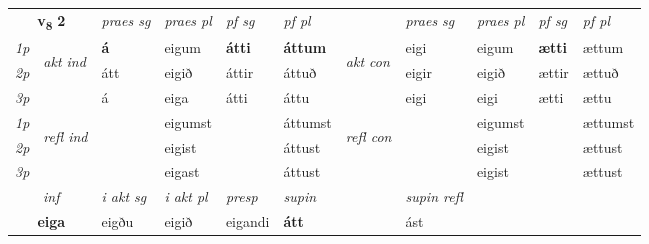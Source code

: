 \noindent
\begin{tabular}{lllllllllll} \toprule
\multicolumn{2}{c}{\textbf{v{\textsubscript{8}}} \Large{\textbf{2}}}  &  \textit{praes sg}  & \textit{praes pl}  &\textit{ pf sg} & \textit{pf pl} &  &  \textit{praes sg}  & \textit{praes pl}  & \textit{pf sg} & \textit{pf pl } \\*
	\cmidrule{3-6} \cmidrule{8-11}
 {\textit{1p}} & \multirow{3}{*}{\begin{turn}{90}\textit{akt ind}\end{turn}} & \textbf{á} & eigum & \textbf{átti} & \textbf{áttum} & \multirow{3}{*}{\begin{turn}{90}\textit{akt con}\end{turn}} &eigi & eigum & \textbf{ætti} & ættum\\*
 {\textit{2p}} &  &  átt  & eigið & áttir & áttuð & & eigir & eigið & ættir & ættuð \\*
{\textit{3p}} &  & á & eiga & átti & áttu & & eigi & eigi& ætti & ættu \\*
\cmidrule{3-6} \cmidrule{8-11}
 {\textit{1p}} & \multirow{3}{*}{\begin{turn}{90}\textit{refl ind}\end{turn}}  &  & eigumst &  & áttumst & \multirow{3}{*}{\begin{turn}{90}\textit{refl con}\end{turn}}  & & eigumst &  & ættumst \\*
 {\textit{2p}} &  &  & eigist &  & áttust & & & eigist &  & ættust \\*
 {\textit{3p}}  & &  & eigast &  & áttust & &  & eigist&  & ættust \\*
\cmidrule{3-6} \cmidrule{8-11}

   \multicolumn{2}{c}{\textit{inf}}  & \textit{i akt sg} & \textit{i akt pl}   & \textit{presp} & \textit{supin} && \textit{supin refl}  \\*
  \multicolumn{2}{c}{\textbf{eiga}} & eigðu  & eigið   & eigandi &  \textbf{átt} && ást  \\*
\end{tabular}

